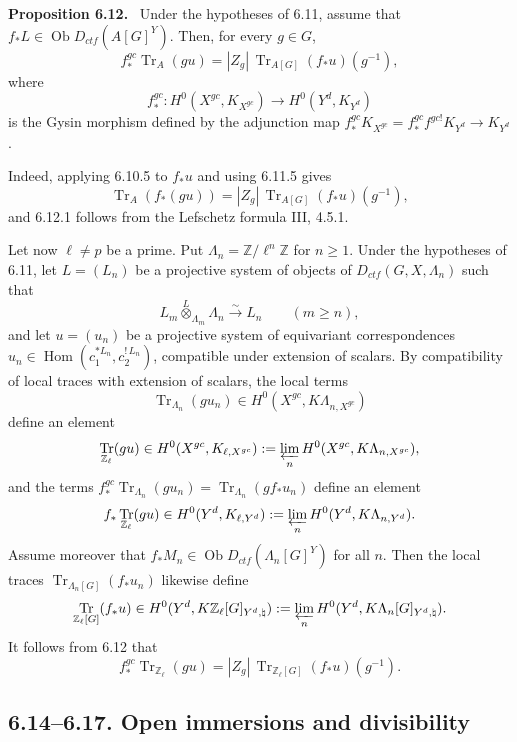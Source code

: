 \documentclass[11pt]{article}
\theoremstyle{plain}
\theoremstyle{definition}
\theoremstyle{remark}
\newenvironment{statement}[1]{\par\medskip\noindent\textbf{#1.}\ }{\par\medskip}
\newcommand{\bZ}{\mathbb Z}
\DeclareMathOperator{\Hom}{Hom}
\DeclareMathOperator{\ob}{Ob}
\DeclareMathOperator{\Tr}{Tr}
\begin{document}
\begin{statement}{Proposition 6.12}
Under the hypotheses of 6.11, assume that
$f_*L\in\ob D_{ctf}(A[G]^Y)$. Then, for every $g\in G$,
\begin{equation}\tag{6.12.1}
 f_*^{gc}\Tr_A(gu)=|Z_g|\,\Tr_{A[G]}(f_*u)(g^{-1}),
\end{equation}
where
\[
      f_*^{gc}:H^0(X^{gc},K_{X^{gc}})\longrightarrow H^0(Y^d,K_{Y^d})
\]
is the Gysin morphism defined by the adjunction map
$f_*^{gc}K_{X^{gc}}=f_*^{gc}f^{gc!}K_{Y^d}\to K_{Y^d}$.
\end{statement}

Indeed, applying 6.10.5 to $f_*u$ and using 6.11.5 gives
\[
     \Tr_A(f_*(gu))=|Z_g|\,\Tr_{A[G]}(f_*u)(g^{-1}),
\]
and 6.12.1 follows from the Lefschetz formula III, 4.5.1.

Let now $\ell\ne p$ be a prime. Put $\Lambda_n=\bZ/\ell^n\bZ$ for $n\ge1$.
Under the hypotheses of 6.11, let $L=(L_n)$ be a projective system of objects of
$D_{ctf}(G,X,\Lambda_n)$ such that
\[
      L_m\overset{L}{\otimes}_{\Lambda_m}\Lambda_n\xrightarrow{\sim}L_n
      \qquad (m\ge n),
\]
and let $u=(u_n)$ be a projective system of equivariant correspondences
$u_n\in\Hom(c_1^{*L_n},c_2^{!\,L_n})$, compatible under extension of scalars. By
compatibility of local traces with extension of scalars, the local terms
\[
      \Tr_{\Lambda_n}(gu_n)\in H^0(X^{gc},K\Lambda_{n,X^{gc}})
\]
define an element
\[
      \Tr_{\bZ_\ell}(gu)\in H^0(X^{gc},K_{\ell,X^{gc}})
      :=\varprojlim_n H^0(X^{gc},K\Lambda_{n,X^{gc}}),
\]
and the terms $f_*^{gc}\Tr_{\Lambda_n}(gu_n)=\Tr_{\Lambda_n}(g f_*u_n)$ define an
element
\[
      f_*\Tr_{\bZ_\ell}(gu)\in H^0(Y^d,K_{\ell,Y^d})
      :=\varprojlim_n H^0(Y^d,K\Lambda_{n,Y^d}).
\]
Assume moreover that $f_*M_n\in\ob D_{ctf}(\Lambda_n[G]^Y)$ for all $n$. Then the
local traces $\Tr_{\Lambda_n[G]}(f_*u_n)$ likewise define
\[
      \Tr_{\bZ_\ell[G]}(f_*u)
      \in H^0(Y^d,K\bZ_\ell[G]_{Y^d,\natural})
      :=\varprojlim_n H^0(Y^d,K\Lambda_n[G]_{Y^d,\natural}).
\]
It follows from 6.12 that
\begin{equation}\tag{6.13.1}
      f_*^{gc}\Tr_{\bZ_\ell}(gu)
      =|Z_g|\,\Tr_{\bZ_\ell[G]}(f_*u)(g^{-1}).
\end{equation}

\subsection*{6.14--6.17. Open immersions and divisibility}
\end{document}
